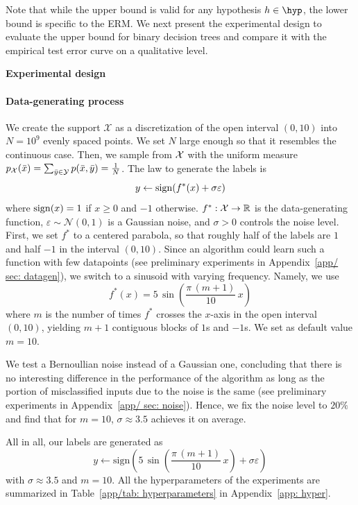 \documentclass[reqno]{amsart}
\begin{document}
Note that while the upper bound is valid for any hypothesis $h\in\hyp$, the lower bound is specific to the ERM. We next present the experimental design to evaluate the upper bound for binary decision trees and compare it with the empirical test error curve on a qualitative level. 

{\bf Experimental design}

\paragraph{Data-generating process} We create the support $\mathcal X$ as a discretization of the open interval $(0,10)$ into $N= 10^9$ evenly spaced points. We set $N$ large enough so that it resembles the continuous case. Then, we sample from $\mathcal{X}$ with the uniform measure $p_{\mathcal{X}}(\bar x) = \sum_{\bar y\in \mathcal{Y}}p(\bar x, \bar y) = \frac{1}{N}$. 
The law to generate the labels is
\[
y \leftarrow \mathrm{sign}(f^*(x) + \sigma\varepsilon)
\] 
where $\mathrm{sign}(x) = 1$ if $x\ge 0$ and $-1$ otherwise. $f^*:\mathcal{X}\to\mathbb{R}$ is the data-generating function, $\varepsilon\sim\mathcal{N}(0,1)$ is a Gaussian noise, and $\sigma>0$ controls the noise level. 
First, we set $f^*$ to a centered parabola, so that roughly half of the labels are $1$ and half $-1$ in the interval $(0,10)$. 
Since an algorithm could learn such a function with few datapoints (see preliminary experiments in Appendix~\ref{app/ sec: datagen}), we switch to a sinusoid with varying frequency. Namely, we use
\begin{equation}\label{eq: sine}
    f^*(x) = 5\, \sin\left(\frac{\pi \,( m  +1)}{10}\, x\right)
\end{equation}
where $m$ is the number of times $f^*$ crosses the $x$-axis in the open interval $(0,10)$, yielding $m+1$ contiguous blocks of $1$s and $-1$s. 
We set as default value $m=10$.

We test a Bernoullian noise instead of a Gaussian one, concluding that there is no interesting difference in the performance of the algorithm as long as the portion of misclassified inputs due to the noise is the same (see preliminary experiments in Appendix~\ref{app/ sec: noise}). Hence, we fix the noise level to $20\%$ and find that for $m = 10$, $\sigma \approx 3.5$ achieves it on average. 

All in all, our labels are generated as
 \[
    y \leftarrow \mathrm{sign}\left(5\, \sin\left(\frac{\pi \,( m  +1)}{10}\, x\right) + \sigma\varepsilon\right)
 \]
 with $\sigma \approx 3.5$ and $m = 10$. All the hyperparameters of the experiments are summarized in Table~\ref{app/tab: hyperparameters} in Appendix~\ref{app: hyper}.
\end{document}
